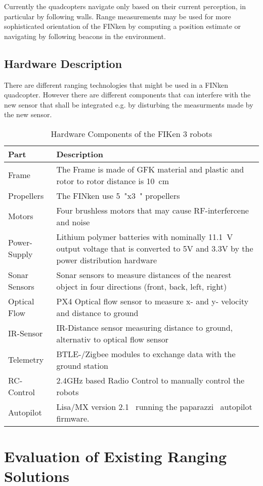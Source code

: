 Currently the quadcopters navigate only based on their current perception, in particular by following walls.
Range measurements may be used for more sophisticated orientation of the FINken by computing a position estimate or navigating by following beacons in the environment.

\subsection{Hardware Description}
There are different ranging technologies that might be used in a FINken quadcopter.
However there are different components that can interfere with the new sensor that shall be integrated e.g. by disturbing the measurments made by the new sensor.

\begin{table}[h]
	\begin{tabularx}{\columnwidth}{l | X}
	Part & Description \\ \hline
	Frame & The Frame is made of GFK material and plastic and rotor to rotor distance is \SI{10}{\centi\metre} \\
	Propellers & The FINken use \SI{5}{"}x\SI{3}{"} propellers \\
	Motors & Four brushless motors that may cause RF-interfercene and noise \\
	Power-Supply & Lithium polymer batteries with nominally \SI{11.1}{\volt} output voltage that is converted to 5V and 3.3V by the power distribution hardware \\
	Sonar Sensors & Sonar sensors to measure distances of the nearest object in four directions (front, back, left, right) \\
	Optical Flow & PX4 Optical flow sensor to measure x- and y- velocity and distance to ground \\
	IR-Sensor & IR-Distance sensor measuring distance to ground, alternativ to optical flow sensor \\
	Telemetry & BTLE-/Zigbee modules to exchange data with the ground station \\
	RC-Control &  2.4GHz based Radio Control to manually control the robots \\
	Autopilot & Lisa/MX version 2.1~\cite{lisamx} running the paparazzi~\cite{paparazzi} autopilot firmware.
	\end{tabularx}
	\caption{Hardware Components of the FIKen 3 robots}
\end{table}

\section{Evaluation of Existing Ranging Solutions}

